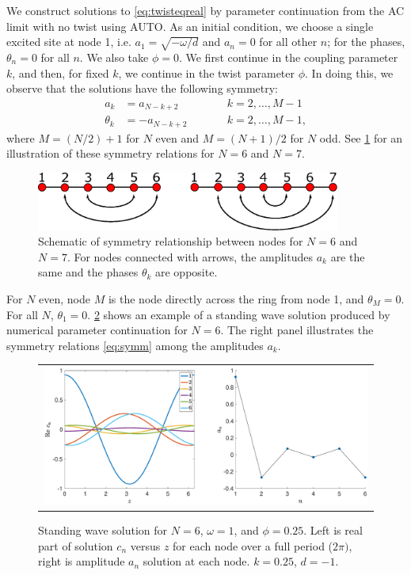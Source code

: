 \documentclass[12pt]{article}
\def\noi{\noindent}
\begin{document}
We construct solutions to \cref{eq:twisteqreal} by parameter continuation from the AC limit with no twist using AUTO. As an initial condition, we choose a single excited site at node 1, i.e. $a_1 = \sqrt{-\omega/d}$ and $a_n = 0$ for all other $n$; for the phases, $\theta_n = 0$ for all $n$. We also take $\phi = 0$. We first continue in the coupling parameter $k$, and then, for fixed $k$, we continue in the twist parameter $\phi$. In doing this, we observe that the solutions have the following symmetry:
\begin{equation}\label{eq:symm}
\begin{aligned}
a_k &= a_{N-k+2} && \qquad k = 2, \dots, M-1 \\
\theta_k &= -a_{N-k+2} && \qquad k = 2, \dots, M-1,
\end{aligned}
\end{equation}
where $M = (N/2)+1$ for $N$ even and $M = (N+1)/2$ for $N$ odd. See \cref{fig:symmetry1} for an illustration of these symmetry relations for $N = 6$ and $N = 7$. 
\begin{figure}[H]
\begin{center}
\includegraphics[width=10cm]{symmetry1.eps}
\end{center}
\caption{Schematic of symmetry relationship between nodes for $N = 6$ and $N=7$. For nodes connected with arrows, the amplitudes $a_k$ are the same and the phases $\theta_k$ are opposite.}
\label{fig:symmetry1}
\end{figure}
\noi For $N$ even, node $M$ is the node directly across the ring from node 1, and $\theta_M = 0$. For all $N$, $\theta_1 = 0$. \cref{fig:twist025} shows an example of a standing wave solution produced by numerical parameter continuation for $N = 6$. The right panel illustrates the symmetry relations \cref{eq:symm} among the amplitudes $a_k$.
\begin{figure}[H]
\begin{center}
\begin{tabular}{c}
\includegraphics[width=15cm]{images/twist025.eps}
\end{tabular}
\end{center}
\caption{Standing wave solution for $N = 6$, $\omega = 1$, and $\phi = 0.25$. Left is real part of solution $c_n$ versus $z$ for each node over a full period ($2 \pi)$, right is amplitude $a_n$ solution at each node. $k = 0.25$, $d=-1$.}
\label{fig:twist025}
\end{figure}
\end{document}
